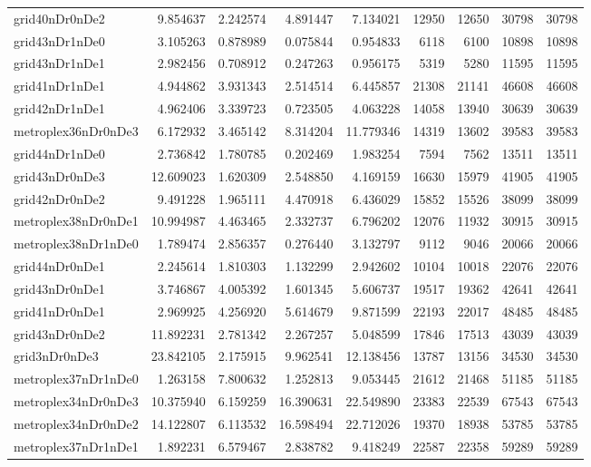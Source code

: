 \begin{longtable}{|l|r|r|r|r|r|r|r|r|}
grid40nDr0nDe2 & 9.854637 & 2.242574 & 4.891447 & 7.134021 & 12950 & 12650 & 30798 & 30798 \\
grid43nDr1nDe0 & 3.105263 & 0.878989 & 0.075844 & 0.954833 & 6118 & 6100 & 10898 & 10898 \\
grid43nDr1nDe1 & 2.982456 & 0.708912 & 0.247263 & 0.956175 & 5319 & 5280 & 11595 & 11595 \\
grid41nDr1nDe1 & 4.944862 & 3.931343 & 2.514514 & 6.445857 & 21308 & 21141 & 46608 & 46608 \\
grid42nDr1nDe1 & 4.962406 & 3.339723 & 0.723505 & 4.063228 & 14058 & 13940 & 30639 & 30639 \\
metroplex36nDr0nDe3 & 6.172932 & 3.465142 & 8.314204 & 11.779346 & 14319 & 13602 & 39583 & 39583 \\
grid44nDr1nDe0 & 2.736842 & 1.780785 & 0.202469 & 1.983254 & 7594 & 7562 & 13511 & 13511 \\
grid43nDr0nDe3 & 12.609023 & 1.620309 & 2.548850 & 4.169159 & 16630 & 15979 & 41905 & 41905 \\
grid42nDr0nDe2 & 9.491228 & 1.965111 & 4.470918 & 6.436029 & 15852 & 15526 & 38099 & 38099 \\
metroplex38nDr0nDe1 & 10.994987 & 4.463465 & 2.332737 & 6.796202 & 12076 & 11932 & 30915 & 30915 \\
metroplex38nDr1nDe0 & 1.789474 & 2.856357 & 0.276440 & 3.132797 & 9112 & 9046 & 20066 & 20066 \\
grid44nDr0nDe1 & 2.245614 & 1.810303 & 1.132299 & 2.942602 & 10104 & 10018 & 22076 & 22076 \\
grid43nDr0nDe1 & 3.746867 & 4.005392 & 1.601345 & 5.606737 & 19517 & 19362 & 42641 & 42641 \\
grid41nDr0nDe1 & 2.969925 & 4.256920 & 5.614679 & 9.871599 & 22193 & 22017 & 48485 & 48485 \\
grid43nDr0nDe2 & 11.892231 & 2.781342 & 2.267257 & 5.048599 & 17846 & 17513 & 43039 & 43039 \\
grid3nDr0nDe3 & 23.842105 & 2.175915 & 9.962541 & 12.138456 & 13787 & 13156 & 34530 & 34530 \\
metroplex37nDr1nDe0 & 1.263158 & 7.800632 & 1.252813 & 9.053445 & 21612 & 21468 & 51185 & 51185 \\
metroplex34nDr0nDe3 & 10.375940 & 6.159259 & 16.390631 & 22.549890 & 23383 & 22539 & 67543 & 67543 \\
metroplex34nDr0nDe2 & 14.122807 & 6.113532 & 16.598494 & 22.712026 & 19370 & 18938 & 53785 & 53785 \\
metroplex37nDr1nDe1 & 1.892231 & 6.579467 & 2.838782 & 9.418249 & 22587 & 22358 & 59289 & 59289 \\

\end{longtable}
